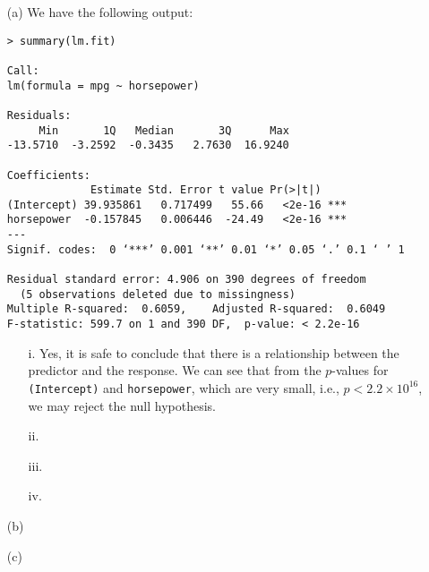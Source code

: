 
\begin{itemize}
    \item[(a)] We have the following output:
        \begin{verbatim}
> summary(lm.fit)

Call:
lm(formula = mpg ~ horsepower)

Residuals:
     Min       1Q   Median       3Q      Max 
-13.5710  -3.2592  -0.3435   2.7630  16.9240 

Coefficients:
             Estimate Std. Error t value Pr(>|t|)    
(Intercept) 39.935861   0.717499   55.66   <2e-16 ***
horsepower  -0.157845   0.006446  -24.49   <2e-16 ***
---
Signif. codes:  0 ‘***’ 0.001 ‘**’ 0.01 ‘*’ 0.05 ‘.’ 0.1 ‘ ’ 1

Residual standard error: 4.906 on 390 degrees of freedom
  (5 observations deleted due to missingness)
Multiple R-squared:  0.6059,    Adjusted R-squared:  0.6049 
F-statistic: 599.7 on 1 and 390 DF,  p-value: < 2.2e-16
        \end{verbatim}
        \begin{itemize}
            \item[i.] Yes, it is safe to conclude that there is a relationship 
                between the predictor and the response. We can see that from
                the $p$-values for \verb|(Intercept)| and \verb|horsepower|,
                which are very small, i.e., $p < 2.2 \times {10}^{16}$, we may 
                reject the null hypothesis.
            \item[ii.] 
            \item[iii.] 
            \item[iv.] 
        \end{itemize}
    \item[(b)] 
    \item[(c)] 
\end{itemize}
